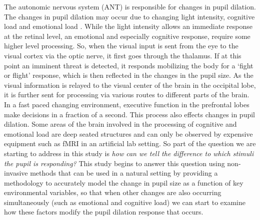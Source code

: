 \documentclass[10pt]{article}
\begin{document}
The autonomic nervous system (ANT) is responsible for changes in pupil dilation. The changes in pupil dilation may occur due to changing light intensity, cognitive load and emotional load \cite{PupilReview}. While the light intensity allows an immediate response at the retinal level, an emotional and especially cognitive response, require some higher level processing. So, when the visual input is sent from the eye to the visual cortex via the optic nerve, it first goes through the thalamus. If at this point an imminent threat is detected, it responds mobilizing the body for a \lq fight or flight' response, which is then reflected in the changes in the pupil size. As the visual information is relayed to the visual center of the brain in the occipital lobe, it is further sent for processing via various routes to different parts of the brain. In a fast paced changing environment, executive function in the prefrontal lobes make decisions in a fraction of a second. This process also effects changes in pupil dilation. Some areas of the brain involved in the processing of cognitive and emotional load are deep seated structures and can only be observed by expensive equipment such as fMRI in an artificial lab setting. So part of the question we are starting to address in this study is \textit{how can we tell the difference to which stimuli the pupil is responding?} This study begins to answer this question using non-invasive methods that can be used in a natural setting by providing a methodology to accurately model the change in pupil size as a function of key environmental variables, so that when other changes are also occurring simultaneously (such as emotional and cognitive load) we can start to examine how these factors modify the pupil dilation response that occurs.
\end{document}
